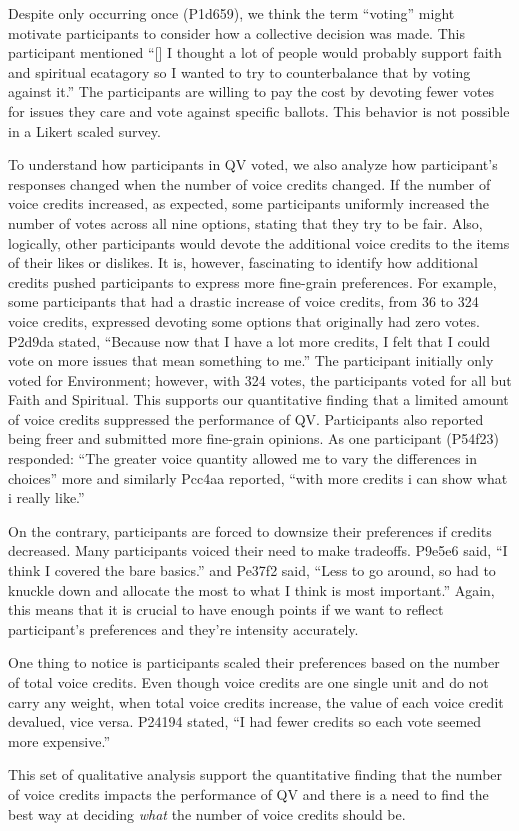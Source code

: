 Despite only occurring once (P1d659), we think the term ``voting'' might motivate participants to consider how a collective decision was made.
This participant mentioned ``[\textellipsis] I thought a lot of people would probably support faith and spiritual ecatagory  so I wanted to try to counterbalance that by voting against it.'' The participants are willing to pay the cost by devoting fewer votes for issues they care and vote against specific ballots. This behavior is not possible in a Likert scaled survey.\par

To understand how participants in QV voted, we also analyze how participant's responses changed when the number of voice credits changed. 
If the number of voice credits increased, as expected, some participants uniformly increased the number of votes across all nine options, stating that they try to be fair. Also, logically, other participants would devote the additional voice credits to the items of their likes or dislikes. 
It is, however, fascinating to identify how additional credits pushed participants to express more fine-grain preferences.
For example, some participants that had a drastic increase of voice credits, from 36 to 324 voice credits, expressed devoting some options that originally had zero votes. 
P2d9da stated, ``Because now that I have a lot more credits, I felt that I could vote on more issues that mean something to me.'' The participant initially only voted for Environment; however, with 324 votes, the participants voted for all but Faith and Spiritual. This supports our quantitative finding that a limited amount of voice credits suppressed the performance of QV. Participants also reported being freer and submitted more fine-grain opinions. As one participant (P54f23) responded: ``The greater voice quantity allowed me to vary the differences in choices'' more and similarly Pcc4aa reported, ``with more credits i can show what i really like.''

On the contrary, participants are forced to downsize their preferences if credits decreased. Many participants voiced their need to make tradeoffs. P9e5e6 said, ``I think I covered the bare basics.'' and Pe37f2 said, ``Less to go around, so had to knuckle down and allocate the most to what I think is most important.'' Again, this means that it is crucial to have enough points if we want to reflect participant's preferences and they're intensity accurately.

One thing to notice is participants scaled their preferences based on the number of total voice credits. Even though voice credits are one single unit and do not carry any weight, when total voice credits increase, the value of each voice credit devalued, vice versa. P24194 stated, ``I had fewer credits so each vote seemed more expensive.''

This set of qualitative analysis support the quantitative finding that the number of voice credits impacts the performance of QV and there is a need to find the best way at deciding \textit{what} the number of voice credits should be.
